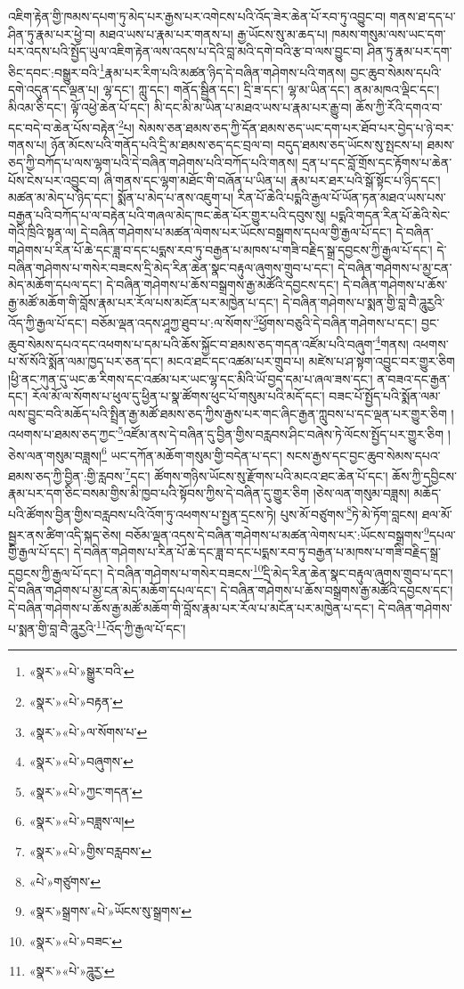 འཇིག་རྟེན་གྱི་ཁམས་དཔག་ཏུ་མེད་པར་རྒྱས་པར་འགེངས་པའི་འོད་ཟེར་ཆེན་པོ་རབ་ཏུ་འབྱུང་བ། གནས་ཐ་དད་པ་ཤིན་ཏུ་རྣམ་པར་ཕྱེ་བ། མཐའ་ཡས་པ་རྣམ་པར་གནས་པ། རྒྱ་ཡོངས་སུ་མ་ཆད་པ། ཁམས་གསུམ་ལས་ཡང་དག་པར་འདས་པའི་སྤྱོད་ཡུལ་འཇིག་རྟེན་ལས་འདས་པ་དེའི་བླ་མའི་དགེ་བའི་རྩ་བ་ལས་བྱུང་བ། ཤིན་ཏུ་རྣམ་པར་དག་ཅིང་དབང་:བསྒྱུར་བའི་\footnote{«སྣར་»«པེ་»སྒྱུར་བའི་}རྣམ་པར་རིག་པའི་མཚན་ཉིད་དེ་བཞིན་གཤེགས་པའི་གནས། བྱང་ཆུབ་སེམས་དཔའི་དགེ་འདུན་དང་ལྡན་པ། ལྷ་དང་། ཀླུ་དང་། གནོད་སྦྱིན་དང་། དྲི་ཟ་དང་། ལྷ་མ་ཡིན་དང་། ནམ་མཁའ་ལྡིང་དང་། མིའམ་ཅི་དང་། ལྟོ་འཕྱེ་ཆེན་པོ་དང་། མི་དང་མི་མ་ཡིན་པ་མཐའ་ཡས་པ་རྣམ་པར་རྒྱུ་བ། ཆོས་ཀྱི་རོའི་དགའ་བ་དང་བདེ་བ་ཆེན་པོས་བརྟེན་\footnote{«སྣར་»«པེ་»བརྟན་}པ། སེམས་ཅན་ཐམས་ཅད་ཀྱི་དོན་ཐམས་ཅད་ཡང་དག་པར་ཐོབ་པར་བྱེད་པ་ཉེ་བར་གནས་པ། ཉོན་མོངས་པའི་གནོད་པའི་དྲི་མ་ཐམས་ཅད་དང་བྲལ་བ། བདུད་ཐམས་ཅད་ཡོངས་སུ་སྤངས་པ། ཐམས་ཅད་ཀྱི་བཀོད་པ་ལས་ལྷག་པའི་དེ་བཞིན་གཤེགས་པའི་བཀོད་པའི་གནས། དྲན་པ་དང་བློ་གྲོས་དང་རྟོགས་པ་ཆེན་པོས་ངེས་པར་འབྱུང་བ། ཞི་གནས་དང་ལྷག་མཐོང་གི་བཞོན་པ་ཡིན་པ། རྣམ་པར་ཐར་པའི་སྒོ་སྟོང་པ་ཉིད་དང་། མཚན་མ་མེད་པ་ཉིད་དང་། སྨོན་པ་མེད་པ་ནས་འཇུག་པ། རིན་པོ་ཆེའི་པདྨའི་རྒྱལ་པོ་ཡོན་ཏན་མཐའ་ཡས་པས་བརྒྱན་པའི་བཀོད་པ་ལ་བརྟེན་པའི་གཞལ་མེད་ཁང་ཆེན་པོར་གྱུར་པའི་དབུས་སུ། པདྨའི་གདན་རིན་པོ་ཆེའི་སེང་གེའི་ཁྲིའི་སྟན་ལ། དེ་བཞིན་གཤེགས་པ་མཚན་ལེགས་པར་ཡོངས་བསྒྲགས་དཔལ་གྱི་རྒྱལ་པོ་དང་། དེ་བཞིན་གཤེགས་པ་རིན་པོ་ཆེ་དང་ཟླ་བ་དང་པདྨས་རབ་ཏུ་བརྒྱན་པ་མཁས་པ་གཟི་བརྗིད་སྒྲ་དབྱངས་ཀྱི་རྒྱལ་པོ་དང་། དེ་བཞིན་གཤེགས་པ་གསེར་བཟངས་དྲི་མེད་རིན་ཆེན་སྣང་བརྟུལ་ཞུགས་གྲུབ་པ་དང་། དེ་བཞིན་གཤེགས་པ་མྱ་ངན་མེད་མཆོག་དཔལ་དང་། དེ་བཞིན་གཤེགས་པ་ཆོས་བསྒྲགས་རྒྱ་མཚོའི་དབྱངས་དང་། དེ་བཞིན་གཤེགས་པ་ཆོས་རྒྱ་མཚོ་མཆོག་གི་བློས་རྣམ་པར་རོལ་པས་མངོན་པར་མཁྱེན་པ་དང་། དེ་བཞིན་གཤེགས་པ་སྨན་གྱི་བླ་བཻ་ཌཱུརྱའི་འོད་ཀྱི་རྒྱལ་པོ་དང་། བཅོམ་ལྡན་འདས་ཤཱཀྱ་ཐུབ་པ་:ལ་སོགས་\footnote{«སྣར་»«པེ་»ལ་སོགས་པ་}ཕྱོགས་བཅུའི་དེ་བཞིན་གཤེགས་པ་དང་། བྱང་ཆུབ་སེམས་དཔའ་དང་འཕགས་པ་དམ་པའི་ཆོས་སྐྱོང་བ་ཐམས་ཅད་གདན་འཛོམ་པའི་བཞུག་\footnote{«སྣར་»«པེ་»བཞུགས་}གནས། འཕགས་པ་སོ་སོའི་སྨོན་ལམ་ཁྱད་པར་ཅན་དང་། མངའ་ཐང་དང་འཚམ་པར་གྲུབ་པ། མཛེས་པ་ཤ་སྟག་འབྱུང་བར་གྱུར་ཅིག །ཕྱི་ནང་ཀུན་དུ་ཡང་ཆ་རིགས་དང་འཚམ་པར་ཡང་ལྷ་དང་མིའི་ཡོ་བྱད་དམ་པ་ཞལ་ཟས་དང་། ན་བཟའ་དང་རྒྱན་དང་། རོལ་མོ་ལ་སོགས་པ་ཕུལ་དུ་ཕྱིན་པ་སྣ་ཚོགས་ཕུང་པོ་གསུམ་པའི་མདོ་དང་། བཟང་པོ་སྤྱོད་པའི་སྨོན་ལམ་ལས་བྱུང་བའི་མཆོད་པའི་སྤྲིན་རྒྱ་མཚོ་ཐམས་ཅད་ཀྱིས་རྒྱས་པར་གང་ཞིང་རྒྱན་ཀླུབས་པ་དང་ལྡན་པར་གྱུར་ཅིག །འཕགས་པ་ཐམས་ཅད་ཀྱང་\footnote{«སྣར་»«པེ་»ཀྱང་གདན་}འཛོམ་ནས་དེ་བཞིན་དུ་བྱིན་གྱིས་བརླབས་ཤིང་བཞེས་ཏེ་ལོངས་སྤྱོད་པར་གྱུར་ཅིག །ཅེས་ལན་གསུམ་བཟླས།\footnote{«སྣར་»«པེ་»བཟླས་ལ།} ཡང་དཀོན་མཆོག་གསུམ་གྱི་བདེན་པ་དང་། སངས་རྒྱས་དང་བྱང་ཆུབ་སེམས་དཔའ་ཐམས་ཅད་ཀྱི་བྱིན་:གྱི་རླབས་\footnote{«སྣར་»«པེ་»གྱིས་བརླབས་}དང་། ཚོགས་གཉིས་ཡོངས་སུ་རྫོགས་པའི་མངའ་ཐང་ཆེན་པོ་དང་། ཆོས་ཀྱི་དབྱིངས་རྣམ་པར་དག་ཅིང་བསམ་གྱིས་མི་ཁྱབ་པའི་སྟོབས་ཀྱིས་དེ་བཞིན་དུ་གྱུར་ཅིག །ཅེས་ལན་གསུམ་བཟླས། མཆོད་པའི་ཚོགས་བྱིན་གྱིས་བརླབས་པའི་འོག་ཏུ་འཕགས་པ་སྤྱན་དྲངས་ཏེ། པུས་མོ་བཙུགས་\footnote{«པེ་»གཙུགས་}ཏེ་མེ་ཏོག་བླངས། ཐལ་མོ་སྦྱར་ནས་ཚིག་འདི་སྐད་ཅེས། བཅོམ་ལྡན་འདས་དེ་བཞིན་གཤེགས་པ་མཚན་ལེགས་པར་:ཡོངས་བསྒྲགས་\footnote{«སྣར་»སྒྲགས་«པེ་»ཡོངས་སུ་སྒྲགས་}དཔལ་གྱི་རྒྱལ་པོ་དང་། དེ་བཞིན་གཤེགས་པ་རིན་པོ་ཆེ་དང་ཟླ་བ་དང་པདྨས་རབ་ཏུ་བརྒྱན་པ་མཁས་པ་གཟི་བརྗིད་སྒྲ་དབྱངས་ཀྱི་རྒྱལ་པོ་དང་། དེ་བཞིན་གཤེགས་པ་གསེར་བཟངས་\footnote{«སྣར་»«པེ་»བཟང་}དྲི་མེད་རིན་ཆེན་སྣང་བརྟུལ་ཞུགས་གྲུབ་པ་དང་། དེ་བཞིན་གཤེགས་པ་མྱ་ངན་མེད་མཆོག་དཔལ་དང་། དེ་བཞིན་གཤེགས་པ་ཆོས་བསྒྲགས་རྒྱ་མཚོའི་དབྱངས་དང་། དེ་བཞིན་གཤེགས་པ་ཆོས་རྒྱ་མཚོ་མཆོག་གི་བློས་རྣམ་པར་རོལ་པ་མངོན་པར་མཁྱེན་པ་དང་། དེ་བཞིན་གཤེགས་པ་སྨན་གྱི་བླ་བཻ་ཌཱུརྱའི་\footnote{«སྣར་»«པེ་»ཌཱུརྱ་}འོད་ཀྱི་རྒྱལ་པོ་དང་། 